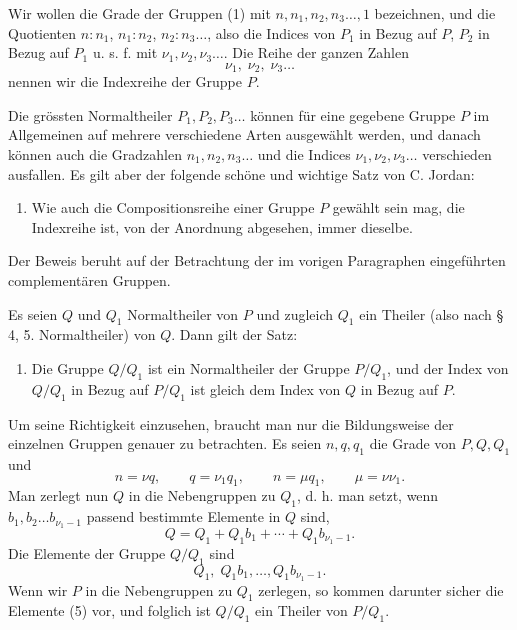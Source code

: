 \documentclass[11pt]{article}
\begin{document}
Wir wollen die Grade der Gruppen (1) mit $n,n_1,n_2,n_3\ldots,1$ bezeichnen, und die Quotienten $n:n_1$, $n_1:n_2$, $n_2:n_3\ldots$, also die Indices von $P_1$ in Bezug auf $P$, $P_2$ in Bezug auf $P_1$ u. s. f. mit $\nu_1,\nu_2,\nu_3\ldots$. Die Reihe der ganzen Zahlen
\begin{equation}
\nu_1,\;\nu_2,\;\nu_3\ldots
\tag{2}
\end{equation}
nennen wir die Indexreihe der Gruppe $P$.

Die grössten Normaltheiler $P_1,P_2,P_3\ldots$ können für eine gegebene Gruppe $P$ im Allgemeinen auf mehrere verschiedene Arten ausgewählt werden, und danach können auch die Gradzahlen $n_1,n_2,n_3\ldots$ und die Indices $\nu_1,\nu_2,\nu_3\ldots$ verschieden ausfallen. Es gilt aber der folgende schöne und wichtige Satz von C. Jordan:

\begin{enumerate}[label=\Roman*.]
\item Wie auch die Compositionsreihe einer Gruppe $P$ gewählt sein mag, die Indexreihe ist, von der Anordnung abgesehen, immer dieselbe.
\end{enumerate}

Der Beweis beruht auf der Betrachtung der im vorigen Paragraphen eingeführten complementären Gruppen.

Es seien $Q$ und $Q_1$ Normaltheiler von $P$ und zugleich $Q_1$ ein Theiler (also nach \S\,4, 5. Normaltheiler) von $Q$. Dann gilt der Satz:

\begin{enumerate}[label=\arabic*.]
\item Die Gruppe $Q/Q_1$ ist ein Normaltheiler der Gruppe $P/Q_1$, und der Index von $Q/Q_1$ in Bezug auf $P/Q_1$ ist gleich dem Index von $Q$ in Bezug auf $P$.
\end{enumerate}

Um seine Richtigkeit einzusehen, braucht man nur die Bildungsweise der einzelnen Gruppen genauer zu betrachten. Es seien $n,q,q_1$ die Grade von $P,Q,Q_1$ und
\begin{equation}
n=\nu q,
\qquad q=\nu_1q_1,
\qquad n=\mu q_1,
\qquad \mu=\nu\nu_1.
\tag{3}
\end{equation}
Man zerlegt nun $Q$ in die Nebengruppen zu $Q_1$, d. h. man setzt, wenn $b_1,b_2\ldots b_{\nu_1-1}$ passend bestimmte Elemente in $Q$ sind,
\begin{equation}
Q=Q_1+Q_1b_1+\cdots+Q_1b_{\nu_1-1}.
\tag{4}
\end{equation}
Die Elemente der Gruppe $Q/Q_1$ sind
\begin{equation}
Q_1,\;Q_1b_1,\ldots,Q_1b_{\nu_1-1}.
\tag{5}
\end{equation}
Wenn wir $P$ in die Nebengruppen zu $Q_1$ zerlegen, so kommen darunter sicher die Elemente (5) vor, und folglich ist $Q/Q_1$ ein Theiler von $P/Q_1$.
\end{document}
